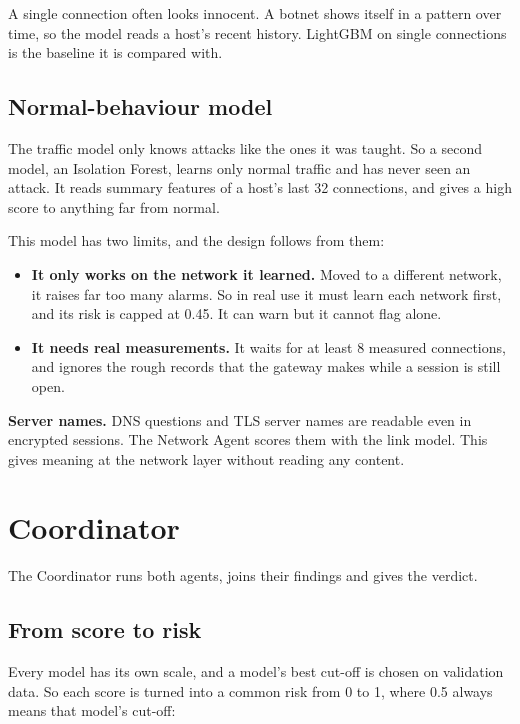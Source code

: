\documentclass[11pt,a4paper]{article}
\begin{document}
A single connection often looks innocent. A botnet shows itself in a pattern over time, so the model reads a host's recent history. LightGBM on single connections is the baseline it is compared with.

\subsection*{Normal-behaviour model}

The traffic model only knows attacks like the ones it was taught. So a second model, an Isolation Forest, learns only normal traffic and has never seen an attack. It reads summary features of a host's last 32 connections, and gives a high score to anything far from normal.

This model has two limits, and the design follows from them:

\begin{itemize}
  \item \textbf{It only works on the network it learned.} Moved to a different network, it raises far too many alarms. So in real use it must learn each network first, and its risk is capped at 0.45. It can warn but it cannot flag alone.
  \item \textbf{It needs real measurements.} It waits for at least 8 measured connections, and ignores the rough records that the gateway makes while a session is still open.
\end{itemize}

\textbf{Server names.} DNS questions and TLS server names are readable even in encrypted sessions. The Network Agent scores them with the link model. This gives meaning at the network layer without reading any content.

\section{Coordinator}

The Coordinator runs both agents, joins their findings and gives the verdict.

\subsection*{From score to risk}

Every model has its own scale, and a model's best cut-off is chosen on validation data. So each score is turned into a common risk from 0 to 1, where 0.5 always means that model's cut-off:
\end{document}
